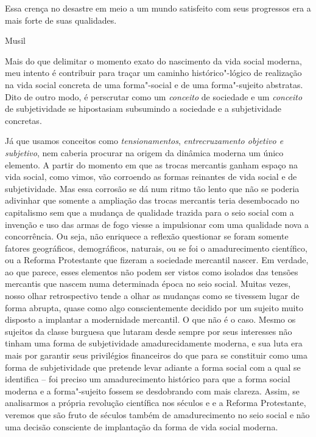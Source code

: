 \epigraph{Essa crença no desastre em meio a um mundo satisfeito com seus
progressos era a mais forte de suas qualidades.}{Musil}

Mais do que delimitar o momento exato do nascimento da vida social
moderna, meu intento é contribuir para traçar um caminho
histórico"-lógico de realização na vida social concreta de uma forma"-social e de
uma forma"-sujeito abstratas. Dito de outro modo, é perscrutar como um
\emph{conceito} de sociedade e um \emph{conceito} de subjetividade se
hipostasiam subsumindo a sociedade e a subjetividade concretas.

Já que usamos conceitos como \emph{tensionamentos},
\emph{entrecruzamento objetivo e subjetivo}, nem caberia procurar na
origem da dinâmica moderna um único elemento. A partir do momento em que
as trocas mercantis ganham espaço na vida social, como vimos, vão
corroendo as formas reinantes de vida social e de subjetividade. Mas
essa corrosão se dá num ritmo tão lento que não se poderia adivinhar que
somente a ampliação das trocas mercantis teria desembocado no
capitalismo sem que a mudança de qualidade trazida para o seio social
com a invenção e uso das armas de fogo viesse a impulsionar com uma
qualidade nova a concorrência. Ou seja, não enriquece a reflexão questionar
se foram somente fatores geográficos, demográficos, naturais, ou se
foi o amadurecimento científico, ou a Reforma Protestante que fizeram a
sociedade mercantil nascer. Em verdade, ao que parece, esses elementos
não podem ser vistos como isolados das tensões mercantis que nascem numa
determinada época no seio social. Muitas vezes, nosso olhar
retrospectivo tende a olhar as mudanças como se tivessem lugar de forma
abrupta, quase como algo conscientemente decidido por um sujeito muito
disposto a implantar a modernidade mercantil. O que não é o caso. Mesmo
os sujeitos da classe burguesa que lutaram desde sempre por seus
interesses não tinham uma forma de subjetividade amadurecidamente
moderna, e sua luta era mais por garantir seus privilégios financeiros
do que para se constituir como uma forma de subjetividade que pretende
levar adiante a forma social com a qual se identifica -- foi preciso um
amadurecimento histórico para que a forma social moderna e a
forma"-sujeito fossem se desdobrando com mais clareza. Assim, se
analisarmos a própria revolução científica nos séculos  e  e a
Reforma Protestante, veremos que são fruto de séculos também de
amadurecimento no seio social e não uma decisão consciente de
implantação da forma de vida social moderna.

